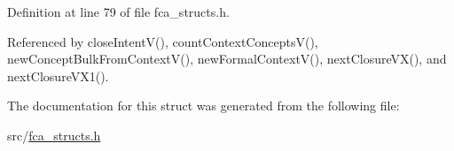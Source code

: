 \-Definition at line 79 of file fca\-\_\-structs.\-h.



\-Referenced by close\-Intent\-V(), count\-Context\-Concepts\-V(), new\-Concept\-Bulk\-From\-Context\-V(), new\-Formal\-Context\-V(), next\-Closure\-V\-X(), and next\-Closure\-V\-X1().



\-The documentation for this struct was generated from the following file\-:\begin{DoxyCompactItemize}
\item 
src/\hyperlink{fca__structs_8h}{fca\-\_\-structs.\-h}\end{DoxyCompactItemize}
